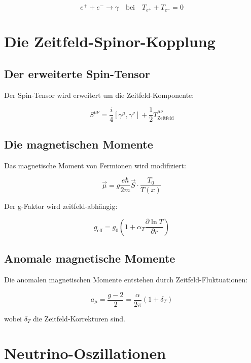 \documentclass[12pt,a4paper]{report}
\begin{document}
\begin{equation}
	e^+ + e^- \to \gamma \quad \text{bei} \quad T_{e^+} + T_{e^-} = 0
\end{equation}

\section{Die Zeitfeld-Spinor-Kopplung}

\subsection{Der erweiterte Spin-Tensor}

Der Spin-Tensor wird erweitert um die Zeitfeld-Komponente:

\begin{equation}
	S^{\mu\nu} = \frac{i}{4}[\gamma^\mu, \gamma^\nu] + \frac{1}{2}T^{\mu\nu}_{\text{Zeitfeld}}
\end{equation}

\subsection{Die magnetischen Momente}

Das magnetische Moment von Fermionen wird modifiziert:

\begin{equation}
	\vec{\mu} = g\frac{e\hbar}{2m}\vec{S} \cdot \frac{T_0}{T(x)}
\end{equation}

Der g-Faktor wird zeitfeld-abhängig:

\begin{equation}
	g_{\text{eff}} = g_0\left(1 + \alpha_T\frac{\partial\ln T}{\partial r}\right)
\end{equation}

\subsection{Anomale magnetische Momente}

Die anomalen magnetischen Momente entstehen durch Zeitfeld-Fluktuationen:

\begin{equation}
	a_\mu = \frac{g-2}{2} = \frac{\alpha}{2\pi}\left(1 + \delta_T\right)
\end{equation}

wobei $\delta_T$ die Zeitfeld-Korrekturen sind.

\section{Neutrino-Oszillationen}
\end{document}
